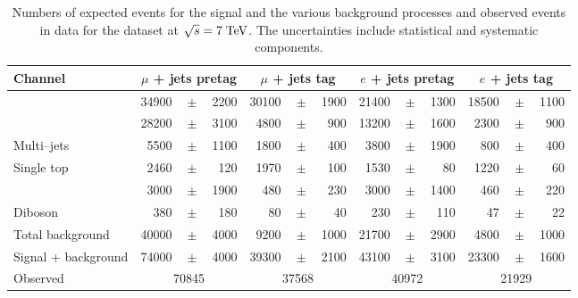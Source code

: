 \begin{table}
  \centering
  \begin{tabular}{ l  rrr  rrr  rrr  rrr }
    \toprule
    Channel & \multicolumn{3}{c}{$\mu$ + jets pretag} & \multicolumn{3}{c}{$\mu$ + jets tag} & \multicolumn{3}{c}{$e$ + jets pretag} & \multicolumn{3}{c}{$e$ + jets tag} \\ 
    \midrule
    \ttbar{}         & 34900 &$\!\!\!\pm\!\!\!$& 2200  & 30100 &$\!\!\!\pm\!\!\!$& 1900  & 21400 &$\!\!\!\pm\!\!\!$& 1300  & 18500 &$\!\!\!\pm\!\!\!$& 1100  \\ %
    \wjets{}         & 28200 &$\!\!\!\pm\!\!\!$& 3100  & 4800  &$\!\!\!\pm\!\!\!$& 900   & 13200 &$\!\!\!\pm\!\!\!$& 1600  & 2300  &$\!\!\!\pm\!\!\!$& 900  \\
    Multi--jets      & 5500  &$\!\!\!\pm\!\!\!$& 1100  & 1800  &$\!\!\!\pm\!\!\!$& 400   & 3800  &$\!\!\!\pm\!\!\!$& 1900  & 800   &$\!\!\!\pm\!\!\!$& 400  \\ 
    Single top       & 2460  &$\!\!\!\pm\!\!\!$& 120   & 1970  &$\!\!\!\pm\!\!\!$& 100   & 1530  &$\!\!\!\pm\!\!\!$& 80    & 1220  &$\!\!\!\pm\!\!\!$& 60   \\ 
    \zjets{}         & 3000  &$\!\!\!\pm\!\!\!$& 1900  & 480   &$\!\!\!\pm\!\!\!$& 230   & 3000  &$\!\!\!\pm\!\!\!$& 1400  & 460   &$\!\!\!\pm\!\!\!$& 220   \\
    Diboson          & 380   &$\!\!\!\pm\!\!\!$& 180   & 80    &$\!\!\!\pm\!\!\!$& 40    & 230   &$\!\!\!\pm\!\!\!$& 110   & 47    &$\!\!\!\pm\!\!\!$& 22   \\ 
    Total background & 40000 &$\!\!\!\pm\!\!\!$& 4000  & 9200  &$\!\!\!\pm\!\!\!$& 1000  & 21700 &$\!\!\!\pm\!\!\!$& 2900  & 4800  &$\!\!\!\pm\!\!\!$& 1000  \\ 
    Signal + background     & 74000 &$\!\!\!\pm\!\!\!$ & 4000 & 39300 &$\!\!\!\pm\!\!\!$& 2100  & 43100 &$\!\!\!\pm\!\!\!$& 3100 & 23300 &$\!\!\!\pm\!\!\!$& 1600  \\ \hline
    Observed                & \multicolumn{3}{c}{70845}  & \multicolumn{3}{c}{37568} & \multicolumn{3}{c}{40972}      & \multicolumn{3}{c}{21929} \\
    \bottomrule
  \end{tabular}
  \caption[Event yields for the samples at $\sqrt{s} = 7 \TeV{}$]{
    Numbers of expected events for the \ttbar{} signal and the various background 
    processes and observed events in data for the dataset 
    at $\sqrt{s} = 7 \TeV{}$.
    The uncertainties include statistical and systematic components.}
  \label{tab:yields2011}
\end{table}


